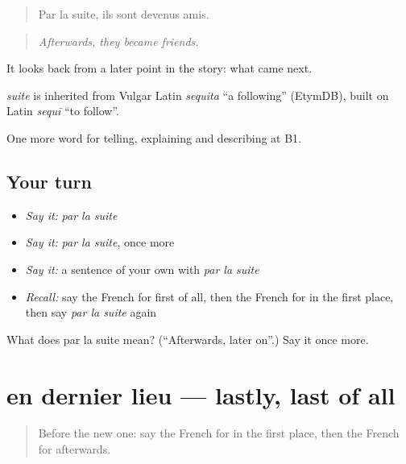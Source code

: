 \begin{quote}
Par la suite, ils sont devenus amis.
\end{quote}

\begin{quote}
\emph{Afterwards, they became friends.}
\end{quote}

It looks back from a later point in the story: what came next.

\begin{cousinweb}
\emph{suite} is inherited from Vulgar Latin \emph{sequita} \textquotedblleft{}a following\textquotedblright{} (EtymDB), built on Latin \emph{sequī} \textquotedblleft{}to follow\textquotedblright{}.
\end{cousinweb}

\begin{grammarlens}[title={What you've built}]
One more word for telling, explaining and describing at B1.
\end{grammarlens}

\subsection*{Your turn}
\begin{itemize}
\raggedright
  \item \emph{Say it:} \emph{par la suite}
  \item \emph{Say it:} \emph{par la suite}, once more
  \item \emph{Say it:} a sentence of your own with \emph{par la suite}
  \item \emph{Recall:} say the French for first of all, then the French for in the first place, then say \emph{par la suite} again
\end{itemize}

\begin{tcolorbox}[breakable,colback=teal!4,colframe=teal!35!black,title={Before you move on}]
What does par la suite mean? (\textquotedblleft{}Afterwards, later on\textquotedblright{}.) Say it once more.
\end{tcolorbox}
\section[en dernier lieu]{en dernier lieu — lastly, last of all}

\label{lesson:FR-C268-en-dernier-lieu}



\begin{quote}
Before the new one: say the French for in the first place, then the French for afterwards.
\end{quote}

